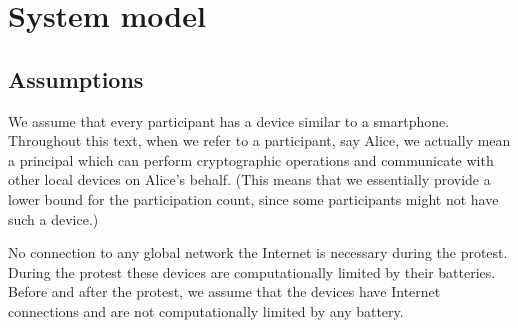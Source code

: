 \mode*

\section{System model}%
\label{SystemModel}

\subsection{Assumptions}

We assume that every participant has a device similar to a smartphone.
Throughout this text, when we refer to a participant, say Alice, we actually 
mean a principal which can perform cryptographic operations and communicate with 
other local devices on Alice's behalf.
(This means that we essentially provide a lower bound for the participation 
count, since some participants might not have such a device.)


No connection to any global network the Internet is necessary during the 
protest.
During the protest these devices are computationally limited by their 
batteries.
Before and after the protest, we assume that the devices have Internet 
connections and are not computationally limited by any battery.


